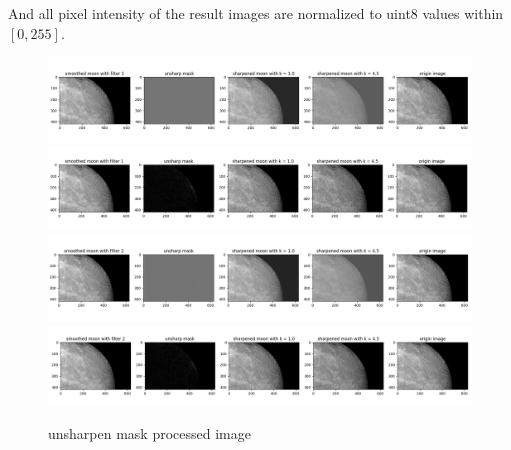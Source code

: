 And all pixel intensity of the result images are normalized to uint8 values within $[0,255]$.\\
\begin{figure}[htbp]
    \centering
	\includegraphics[width=\textwidth]{../images/p2/p2c_1_no_drop.png}
	\includegraphics[width=\textwidth]{../images/p2/p2c_1_drop.png}
    \includegraphics[width=\textwidth]{../images/p2/p2c_2_no_drop.png}
	\includegraphics[width=\textwidth]{../images/p2/p2c_2_drop.png}
    \caption{unsharpen mask processed image}
\label{fig:p2c}
\end{figure}

\newpage